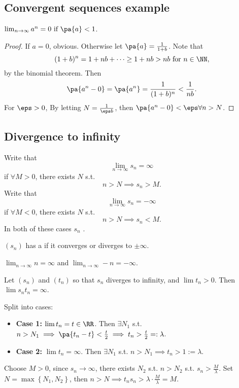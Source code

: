 \documentclass[11pt]{scrartcl}
\numberwithin{equation}{section}
\begin{document}
\subsection{Convergent sequences example}

\begin{example}
    $\lim_{n\rightarrow\infty}a^n = 0 \text{ if } \pa{a} < 1$.
    \begin{proof}
        If $a=0$, obvious. Otherwise let $\pa{a}=\frac{1}{1+b}$.
        Note that 
        \[ (1+b)^n = 1+nb+\cdots \geq 1 +nb > nb \text{ for } n\in\NN,\]
        by the binomial theorem. Then 
        \[ \pa{a^n-0}=\pa{a^n}=\frac{1}{(1+b)^n} < \frac{1}{nb}. \]
        For $\eps > 0$, By letting $N=\frac{1}{\eps b}$, then 
        $\pa{a^n-0}<\eps \forall n > N$.
    \end{proof}
\end{example}

\subsection{Divergence to infinity}

\begin{definition}
    Write that 
    \[ \lim_{n\rightarrow \infty}s_n = \infty \]
    if $\forall M>0$, there exists $N$ s.t. 
    \[ n>N \implies s_n>M. \]
    Write that 
    \[ \lim_{n\rightarrow \infty}s_n = -\infty \]
    if $\forall M<0$, there exists $N$ s.t. 
    \[ n>N \implies s_n<M. \]
    In both of these cases $s_n$ .
\end{definition}

\begin{definition}
    $(s_n)$ has a  if it converges or diverges to $\pm\infty$.
\end{definition}

\begin{example}
    $\lim_{n\rightarrow\infty}n = \infty$ and 
    $\lim_{n\rightarrow\infty}-n = -\infty$.
\end{example}

\begin{proposition}
    Let $(s_n)$ and $(t_n)$ so that $s_n$ diverges to infinity, and 
    $\lim t_n > 0$.
    Then $\lim s_n t_n = \infty$.
\end{proposition}

\begin{subproof}
    Split into cases:
    \begin{itemize}
        \item \textbf{Case 1: }$\lim t_n=t \in\RR$. Then 
        $\exists N_1$ s.t. $n>N_1\implies \pa{t_n-t}<\frac{t}{2}
        \implies t_n>\frac{t}{2} =: \lambda$.
        \item \textbf{Case 2: }$\lim t_n=\infty$. Then
        $\exists N_1$ s.t. $n>N_1\implies t_n>1 := \lambda$.
    \end{itemize}
    Choose $M>0$, since $s_n\rightarrow \infty$, there exists $N_2$ s.t.
    $n>N_2$ s.t. $s_n >\frac{M}{\lambda}$. Set $N=\max \left\{N_1,N_2\right\}$, then $n>N \implies t_ns_n > \lambda \cdot\frac{M}{\lambda}=M$.
\end{subproof}
\end{document}

